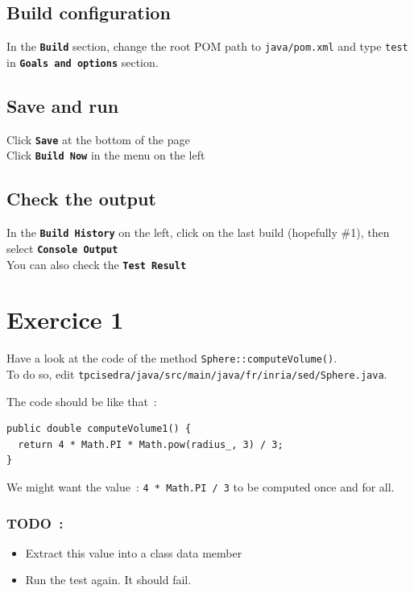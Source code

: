 \documentclass{article}
\begin{document}
\subsection{Build configuration}
In the \textbf{\texttt{Build}} section, change the root POM path to \texttt{java/pom.xml} and type \texttt{test} in \textbf{\texttt{Goals and options}} section.

\subsection{Save and run}
Click \textbf{\texttt{Save}} at the bottom of the page \\
Click \textbf{\texttt{Build Now}} in the menu on the left

\subsection{Check the output}
In the \textbf{\texttt{Build History}} on the left, click on the last build (hopefully \#1), then select \textbf{\texttt{Console Output}} \\
You can also check the \textbf{\texttt{Test Result}}



\section{Exercice 1}

Have a look at the code of the method \texttt{Sphere::computeVolume()}.\\
To do so, edit \texttt{tpcisedra/java/src/main/java/fr/inria/sed/Sphere.java}.

The code should be like that~:
\begin{lstlisting}
public double computeVolume1() {
  return 4 * Math.PI * Math.pow(radius_, 3) / 3;
}
\end{lstlisting}


We might want the value~: \verb?4 * Math.PI / 3? to be computed once and for all.

\subsubsection{TODO~:}
\begin{itemize}
\item Extract this value into a class data member
\item Run the test again. It should fail.
\end{itemize}
\end{document}
